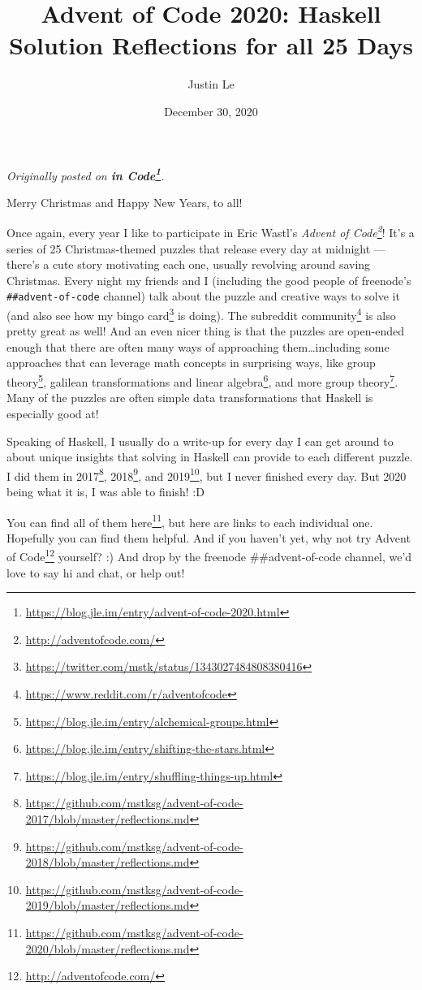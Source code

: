 \documentclass[]{article}
\title{Advent of Code 2020: Haskell Solution Reflections for all 25 Days}
\author{Justin Le}
\date{December 30, 2020}
\renewcommand{\href}[2]{#2\footnote{\url{#1}}}
\begin{document}
\maketitle

\emph{Originally posted on
\textbf{\href{https://blog.jle.im/entry/advent-of-code-2020.html}{in Code}}.}

Merry Christmas and Happy New Years, to all!

Once again, every year I like to participate in Eric Wastl's
\emph{\href{http://adventofcode.com/}{Advent of Code}}! It's a series of 25
Christmas-themed puzzles that release every day at midnight --- there's a cute
story motivating each one, usually revolving around saving Christmas. Every
night my friends and I (including the good people of freenode's
\texttt{\#\#advent-of-code} channel) talk about the puzzle and creative ways to
solve it (and also see how my
\href{https://twitter.com/mstk/status/1343027484808380416}{bingo card} is
doing). The \href{https://www.reddit.com/r/adventofcode}{subreddit community} is
also pretty great as well! And an even nicer thing is that the puzzles are
open-ended enough that there are often many ways of approaching
them\ldots including some approaches that can leverage math concepts in
surprising ways, like
\href{https://blog.jle.im/entry/alchemical-groups.html}{group theory},
\href{https://blog.jle.im/entry/shifting-the-stars.html}{galilean
transformations and linear algebra}, and
\href{https://blog.jle.im/entry/shuffling-things-up.html}{more group theory}.
Many of the puzzles are often simple data transformations that Haskell is
especially good at!

Speaking of Haskell, I usually do a write-up for every day I can get around to
about unique insights that solving in Haskell can provide to each different
puzzle. I did them in
\href{https://github.com/mstksg/advent-of-code-2017/blob/master/reflections.md}{2017},
\href{https://github.com/mstksg/advent-of-code-2018/blob/master/reflections.md}{2018},
and
\href{https://github.com/mstksg/advent-of-code-2019/blob/master/reflections.md}{2019},
but I never finished every day. But 2020 being what it is, I was able to finish!
:D

You can find
\href{https://github.com/mstksg/advent-of-code-2020/blob/master/reflections.md}{all
of them here}, but here are links to each individual one. Hopefully you can find
them helpful. And if you haven't yet, why not try
\href{http://adventofcode.com/}{Advent of Code} yourself? :) And drop by the
freenode \#\#advent-of-code channel, we'd love to say hi and chat, or help out!
\end{document}

